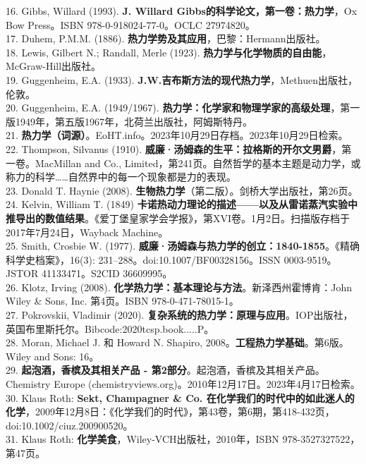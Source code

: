 16. Gibbs, Willard (1993). \textbf{J. Willard Gibbs的科学论文，第一卷：热力学}，Ox Bow Press。ISBN 978-0-918024-77-0。OCLC 27974820。\\
17. Duhem, P.M.M. (1886). \textbf{热力学势及其应用}，巴黎：Hermann出版社。\\
18. Lewis, Gilbert N.; Randall, Merle (1923). \textbf{热力学与化学物质的自由能}，McGraw-Hill出版社。\\
19. Guggenheim, E.A. (1933). \textbf{J.W.吉布斯方法的现代热力学}，Methuen出版社，伦敦。\\
20. Guggenheim, E.A. (1949/1967). \textbf{热力学：化学家和物理学家的高级处理}，第一版1949年，第五版1967年，北荷兰出版社，阿姆斯特丹。\\
21. \textbf{热力学（词源）}。EoHT.info。2023年10月29日存档。2023年10月29日检索。\\
22. Thompson, Silvanus (1910). \textbf{威廉·汤姆森的生平：拉格斯的开尔文男爵}，第一卷。MacMillan and Co., Limited，第241页。自然哲学的基本主题是动力学，或称力的科学……自然界中的每一个现象都是力的表现。\\
23. Donald T. Haynie (2008). \textbf{生物热力学}（第二版）。剑桥大学出版社，第26页。\\
24. Kelvin, William T. (1849) \textbf{卡诺热动力理论的描述——以及从雷诺蒸汽实验中推导出的数值结果}。《爱丁堡皇家学会学报》，第XVI卷。1月2日。扫描版存档于2017年7月24日，Wayback Machine。\\
25. Smith, Crosbie W. (1977). \textbf{威廉·汤姆森与热力学的创立：1840-1855}。《精确科学史档案》，16(3): 231–288。doi:10.1007/BF00328156。ISSN 0003-9519。JSTOR 41133471。S2CID 36609995。\\
26. Klotz, Irving (2008). \textbf{化学热力学：基本理论与方法}。新泽西州霍博肯：John Wiley & Sons, Inc. 第4页。ISBN 978-0-471-78015-1。\\
27. Pokrovskii, Vladimir (2020). \textbf{复杂系统的热力学：原理与应用}。IOP出版社，英国布里斯托尔。Bibcode:2020tcsp.book.....P。\\
28. Moran, Michael J. 和 Howard N. Shapiro, 2008。\textbf{工程热力学基础}。第6版。Wiley and Sons: 16。\\
29. \textbf{起泡酒，香槟及其相关产品 - 第2部分}。起泡酒，香槟及其相关产品。Chemistry Europe (chemistryviews.org)。2010年12月17日。2023年4月17日检索。\\
30. Klaus Roth: \textbf{Sekt, Champagner & Co. 在化学我们的时代中的如此迷人的化学}，2009年12月8日：《化学我们的时代》，第43卷，第6期，第418-432页，doi:10.1002/ciuz.200900520。\\
31. Klaus Roth: \textbf{化学美食}，Wiley-VCH出版社，2010年，ISBN 978-3527327522，第47页。\\

